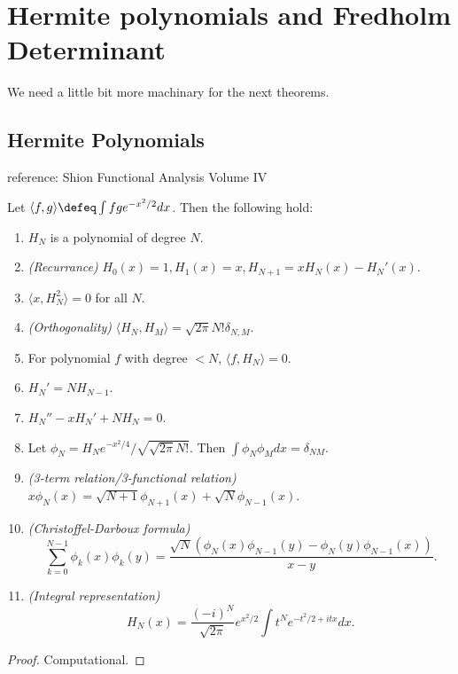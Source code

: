 \section{Hermite polynomials and Fredholm Determinant}

We need a little bit more machinary for the next theorems.
\subsection*{Hermite Polynomials}
reference: Shion Functional Analysis Volume IV

\begin{aproposition}[breakable]{}{}
    
    Let $\langle f,g\rangle\defeq \int fg e^{-x^2/2}dx$. Then the following hold:
    \begin{enumerate}
        \item $H_N$ is a polynomial of degree $N$.
        \item \textit{(Recurrance)} $H_0(x)=1,H_1(x)=x,H_{N+1}=xH_N(x)-H_N'(x)$.
        \item $\langle x, H_N^2\rangle=0$ for all $N$.
        \item \textit{(Orthogonality)} $\langle H_N, H_M\rangle =\sqrt{2\pi} N!\delta_{N,M}$.
        \item For polynomial $f$ with degree $<N$, $\langle f, H_N\rangle =0$.
        \item $H_N'=N H_{N-1}$.
        \item $H_N''-x H_{N}'+NH_N=0$.
        \item Let $\phi_N=H_N e^{-x^2/4}/\sqrt{\sqrt{2\pi}N!}$. Then $\int \phi_N \phi_Mdx = \delta_{NM}$.
        \item \textit{(3-term relation/3-functional relation)} $x\phi_N(x) = \sqrt{N+1} \phi_{N+1}(x)+\sqrt{N}\phi_{N-1}(x)$.
        \item \textit{(Christoffel-Darboux formula)} \[
            \sum_{k=0}^{N-1}\phi_k(x)\phi_k(y) = \frac{\sqrt{N}(\phi_N(x)\phi_{N-1}(y)-\phi_N(y)\phi_{N-1}(x))}{x-y}.
        \] 
        \item \textit{(Integral representation)} \[
        H_N(x)=\frac{(-i)^N}{\sqrt{2\pi}} e^{x^2/2}\int t^N e^{-t^2/2+itx}dx.
        \]
        
    \end{enumerate}

\end{aproposition}
\begin{proof}
    Computational.


\end{proof}


